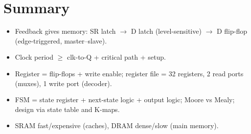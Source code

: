 \section*{Summary}
\begin{itemize}
  \item Feedback gives memory: SR latch $\to$ D latch (level-sensitive)
    $\to$ D flip-flop (edge-triggered, master--slave).
  \item Clock period $\ge$ clk-to-Q + critical path + setup.
  \item Register = flip-flops + write enable; register file = 32 registers,
    2 read ports (muxes), 1 write port (decoder).
  \item FSM = state register + next-state logic + output logic; Moore vs
    Mealy; design via state table and K-maps.
  \item SRAM fast/expensive (caches), DRAM dense/slow (main memory).
\end{itemize}
